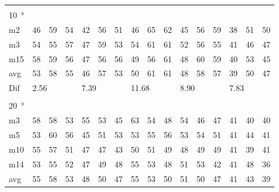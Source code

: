 \begin{table}[H]
\begin{tabular}{l|l|l|l|l|l|l|l|l|l|l|l|l|lll}
 \multicolumn{16}{l}{ } \\                             
\SI{10}{\degree}   & \multicolumn{3}{l|}{} & \multicolumn{3}{l|}{} & \multicolumn{3}{l|}{} & \multicolumn{3}{l|}{} & \multicolumn{3}{l}{}   \\  \hline
m2    &  46    &  59    &  54    &  42    &  56    &   51   &  46    &   65    &   62   &   45    &  56    &  59    & \multicolumn{1}{l|}{38} & \multicolumn{1}{l|}{51} & 50 \\
m3    &  54    &  55    &  57    &   47   &  59    &   53   &   54   &  61     &   61   &   52    & 56     &  55    & \multicolumn{1}{l|}{41} & \multicolumn{1}{l|}{46} & 47 \\
m15  &  58    &  59    &  56    &  47    & 56     &   56   &   49   &   56    &   61   &    48   &   60   &  59    & \multicolumn{1}{l|}{40} & \multicolumn{1}{l|}{53} &  45\\ \hline
avg &  53    & 58     & 55     & 46     &   57   & 53     &  50    &  61     &  61    &  48     & 58     & 57     & \multicolumn{1}{l|}{39} & \multicolumn{1}{l|}{50}  & 47 \\ \hline  
Dif & \multicolumn{3}{l|}{2.56} & \multicolumn{3}{l|}{7.39} & \multicolumn{3}{l|}{11.68} & \multicolumn{3}{l|}{8.90} & \multicolumn{3}{l}{7.83} \\      
\multicolumn{16}{l}{ } \\                
\SI{20}{\degree}   & \multicolumn{3}{l|}{} & \multicolumn{3}{l|}{} & \multicolumn{3}{l|}{} & \multicolumn{3}{l|}{} & \multicolumn{3}{l}{}   \\  \hline
m3    &  58    &  58    &  53    &  55    &  53    &  45    &   63   &    54   &  48    &  54     &  46    &  47    & \multicolumn{1}{l|}{41} & \multicolumn{1}{l|}{40} &40  \\
m5    &  53    &  60    &  56    &  45    &  51    & 53     &   53   &  55     &  56    &  53     &  54    &   51   & \multicolumn{1}{l|}{41} & \multicolumn{1}{l|}{44} &41  \\
m10  &  55    &  57    &  51    &  47    &   47   &   43   &   50   &   51    &   49   &  48     & 49     & 49     & \multicolumn{1}{l|}{41} & \multicolumn{1}{l|}{39} &41  \\
m14  &  53    &  55    &  52    &  47    &  49    &   48   &    55  &  53     &   48   &  51     &  53    &  42    & \multicolumn{1}{l|}{41} & \multicolumn{1}{l|}{48} & 36 \\ \hline
avg & 55     &  58    &  53    &   48   &  50    &  47    &  55    &   53    &  50    &  51     & 50     &  47    & \multicolumn{1}{l|}{41} & \multicolumn{1}{l|}{43}  & 39  \\ \hline  

\end{tabular}
\end{table}
